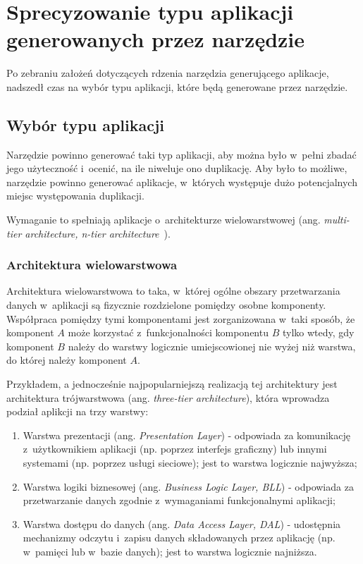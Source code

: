 \chapter{Sprecyzowanie typu aplikacji generowanych przez narzędzie} \label{chap:generated_app_type}

Po zebraniu założeń dotyczących rdzenia narzędzia generującego aplikacje, nadszedł czas na wybór typu aplikacji, które będą generowane przez narzędzie.



\section{Wybór typu aplikacji}

Narzędzie powinno generować taki typ aplikacji, aby można było w~pełni zbadać jego użyteczność i~ocenić, na ile niweluje ono duplikację.
Aby było to możliwe, narzędzie powinno generować aplikacje, w~których występuje dużo potencjalnych miejsc występowania duplikacji.

Wymaganie to spełniają aplikacje o~architekturze wielowarstwowej (ang. \emph{multi-tier architecture, n-tier architecture}~\cite{ntier}).


\subsection{Architektura wielowarstwowa}

Architektura wielowarstwowa to taka, w~której ogólne obszary przetwarzania danych w~aplikacji są fizycznie rozdzielone pomiędzy osobne komponenty.
Współpraca pomiędzy tymi komponentami jest zorganizowana w~taki sposób, że komponent $A$ może korzystać z~funkcjonalności komponentu $B$ tylko wtedy, gdy komponent $B$ należy do warstwy logicznie umiejscowionej nie wyżej niż warstwa, do której należy komponent $A$.

Przykładem, a jednocześnie najpopularniejszą realizacją tej architektury jest architektura trójwarstwowa (ang. \emph{three-tier architecture}), która wprowadza podział aplikcji na trzy warstwy:

\begin{enumerate}
 \item Warstwa prezentacji (ang. \emph{Presentation Layer}) - odpowiada za komunikację z~użytkownikiem aplikacji (np. poprzez interfejs graficzny) lub innymi systemami (np. poprzez usługi sieciowe); jest to warstwa logicznie najwyższa;
 \item Warstwa logiki biznesowej (ang. \emph{Business Logic Layer, BLL}) - odpowiada za przetwarzanie danych zgodnie z~wymaganiami funkcjonalnymi aplikacji;
 \item Warstwa dostępu do danych (ang. \emph{Data Access Layer, DAL}) - udostępnia mechanizmy odczytu i~zapisu danych składowanych przez aplikację (np. w~pamięci lub w~bazie danych); jest to warstwa logicznie najniższa.
\end{enumerate}

